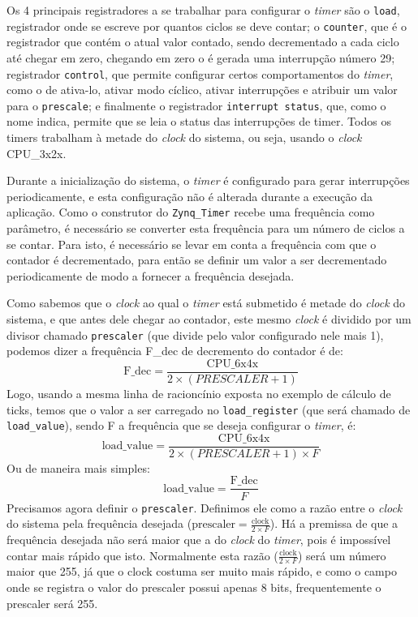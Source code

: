 Os 4 principais registradores a se trabalhar para configurar o \emph{timer} são o \verb+load+, registrador onde se escreve por quantos ciclos se deve contar; o \verb+counter+, que é o registrador que contém o atual valor contado, sendo decrementado a cada ciclo até chegar em zero, chegando em zero o é gerada uma interrupção número 29; registrador \verb+control+, que permite configurar certos comportamentos do \emph{timer}, como o de ativa-lo, ativar modo cíclico, ativar interrupções e atribuir um valor para o \verb+prescale+; e finalmente o registrador \verb+interrupt status+, que, como o nome indica, permite que se leia o status das interrupções de timer. Todos os timers trabalham à metade do \emph{clock} do sistema, ou seja, usando o \emph{clock} CPU\_3x2x.

Durante a inicialização do sistema, o \emph{timer} é configurado para gerar interrupções periodicamente, e esta configuração não é alterada durante a execução da aplicação. Como o construtor do \verb+Zynq_Timer+ recebe uma frequência como parâmetro, é necessário se converter esta frequência para um número de ciclos a se contar. Para isto, é necessário se levar em conta a frequência com que o contador é decrementado, para então se definir um valor a ser decrementado periodicamente de modo a fornecer a frequência desejada.

Como sabemos que o \emph{clock} ao qual o \emph{timer} está submetido é metade do \emph{clock} do sistema, e que antes dele chegar ao contador, este mesmo \emph{clock} é dividido por um divisor chamado \verb+prescaler+ (que divide pelo valor configurado nele mais 1), podemos dizer a frequência F\_dec de decremento do contador é de:
\begin{equation}
	\text{F\_dec} = \frac{\text{CPU\_6x4x}}{2 \times (PRESCALER+1)}
\end{equation}
Logo, usando a mesma linha de racioncínio exposta no exemplo de cálculo de ticks, temos que o valor a ser carregado no \verb+load_register+ (que será chamado de \verb+load_value+), sendo F a frequência que se deseja configurar o \emph{timer}, é:
\begin{equation}
	\text{load\_value} = \frac{\text{CPU\_6x4x}}{2 \times (PRESCALER+1) \times F}
\end{equation}
Ou de maneira mais simples:
\begin{equation}
	\text{load\_value} = \frac{\text{F\_dec}}{F}
\end{equation}
Precisamos agora definir o \verb+prescaler+. Definimos ele como a razão entre o \emph{clock} do sistema pela frequência desejada ($\text{prescaler}=\frac{\text{clock}}{2 \times F}$). Há a premissa de que a frequência desejada não será maior que a do \emph{clock} do \emph{timer}, pois é impossível contar mais rápido que isto. Normalmente esta razão ($\frac{\text{clock}}{2 \times F}$) será um número maior que 255, já que o clock costuma ser muito mais rápido, e como o campo onde se registra o valor do prescaler possui apenas 8 bits, frequentemente o prescaler será 255.


